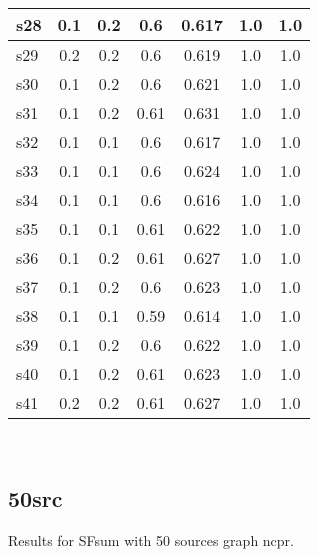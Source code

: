\documentclass{article}
\begin{document}
\begin{tabular}{|l|c|c|c|c|c|c|}
\hline
s28 &0.1 & 0.2 & 0.6 & 0.617 & 1.0 & 1.0\\
\hline
s29 &0.2 & 0.2 & 0.6 & 0.619 & 1.0 & 1.0\\
\hline
s30 &0.1 & 0.2 & 0.6 & 0.621 & 1.0 & 1.0\\
\hline
s31 &0.1 & 0.2 & 0.61 & 0.631 & 1.0 & 1.0\\
\hline
s32 &0.1 & 0.1 & 0.6 & 0.617 & 1.0 & 1.0\\
\hline
s33 &0.1 & 0.1 & 0.6 & 0.624 & 1.0 & 1.0\\
\hline
s34 &0.1 & 0.1 & 0.6 & 0.616 & 1.0 & 1.0\\
\hline
s35 &0.1 & 0.1 & 0.61 & 0.622 & 1.0 & 1.0\\
\hline
s36 &0.1 & 0.2 & 0.61 & 0.627 & 1.0 & 1.0\\
\hline
s37 &0.1 & 0.2 & 0.6 & 0.623 & 1.0 & 1.0\\
\hline
s38 &0.1 & 0.1 & 0.59 & 0.614 & 1.0 & 1.0\\
\hline
s39 &0.1 & 0.2 & 0.6 & 0.622 & 1.0 & 1.0\\
\hline
s40 &0.1 & 0.2 & 0.61 & 0.623 & 1.0 & 1.0\\
\hline
s41 &0.2 & 0.2 & 0.61 & 0.627 & 1.0 & 1.0\\
\hline
\end{tabular}\\

\newpage

\subsection{50src}

\noindent Results for SFsum with 50 sources graph ncpr.
\end{document}
